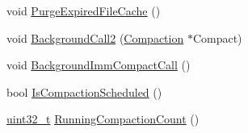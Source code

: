 \begin{DoxyCompactItemize}
\item 
void \hyperlink{classleveldb_1_1_d_b_impl_aaadce3db7f202553ab8befb9fee9d9a6}{Purge\+Expired\+File\+Cache} ()
\item 
void \hyperlink{classleveldb_1_1_d_b_impl_a8f2d02826606bb1753958fb51182c1ff}{Background\+Call2} (\hyperlink{classleveldb_1_1_compaction}{Compaction} $\ast$Compact)
\item 
void \hyperlink{classleveldb_1_1_d_b_impl_ade59d90db532404c3d0e1b2be91dd407}{Background\+Imm\+Compact\+Call} ()
\item 
bool \hyperlink{classleveldb_1_1_d_b_impl_a1138a932779473e7b0cbf70078583508}{Is\+Compaction\+Scheduled} ()
\item 
\hyperlink{stdint_8h_a435d1572bf3f880d55459d9805097f62}{uint32\+\_\+t} \hyperlink{classleveldb_1_1_d_b_impl_a1c17fe1e5d5e39ef02e14a8721b407d6}{Running\+Compaction\+Count} ()
\end{DoxyCompactItemize}

